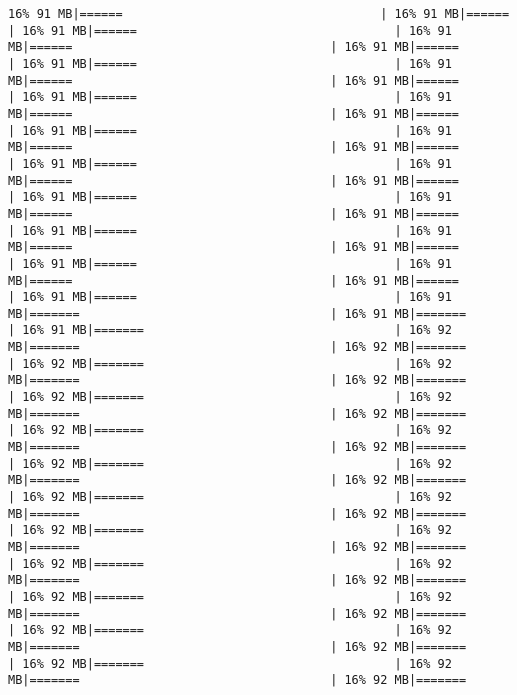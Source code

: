 \documentclass[
]{article}
\begin{document}
\begin{verbatim}
16% 91 MB|======                                    | 16% 91 MB|======                                    | 16% 91 MB|======                                    | 16% 91 MB|======                                    | 16% 91 MB|======                                    | 16% 91 MB|======                                    | 16% 91 MB|======                                    | 16% 91 MB|======                                    | 16% 91 MB|======                                    | 16% 91 MB|======                                    | 16% 91 MB|======                                    | 16% 91 MB|======                                    | 16% 91 MB|======                                    | 16% 91 MB|======                                    | 16% 91 MB|======                                    | 16% 91 MB|======                                    | 16% 91 MB|======                                    | 16% 91 MB|======                                    | 16% 91 MB|======                                    | 16% 91 MB|======                                    | 16% 91 MB|======                                    | 16% 91 MB|======                                    | 16% 91 MB|======                                    | 16% 91 MB|======                                    | 16% 91 MB|======                                    | 16% 91 MB|======                                    | 16% 91 MB|======                                    | 16% 91 MB|=======                                   | 16% 91 MB|=======                                   | 16% 91 MB|=======                                   | 16% 92 MB|=======                                   | 16% 92 MB|=======                                   | 16% 92 MB|=======                                   | 16% 92 MB|=======                                   | 16% 92 MB|=======                                   | 16% 92 MB|=======                                   | 16% 92 MB|=======                                   | 16% 92 MB|=======                                   | 16% 92 MB|=======                                   | 16% 92 MB|=======                                   | 16% 92 MB|=======                                   | 16% 92 MB|=======                                   | 16% 92 MB|=======                                   | 16% 92 MB|=======                                   | 16% 92 MB|=======                                   | 16% 92 MB|=======                                   | 16% 92 MB|=======                                   | 16% 92 MB|=======                                   | 16% 92 MB|=======                                   | 16% 92 MB|=======                                   | 16% 92 MB|=======                                   | 16% 92 MB|=======                                   | 16% 92 MB|=======                                   | 16% 92 MB|=======                                   | 16% 92 MB|=======                                   | 16% 92 MB|=======                                   | 16% 92 MB|=======                                   | 16% 92 MB|=======                                   | 16% 92 MB|=======                                   | 16% 92 MB|=======                                   | 16% 92 MB|=======                                   | 16% 92 MB|=======        
\end{verbatim}
\end{document}
